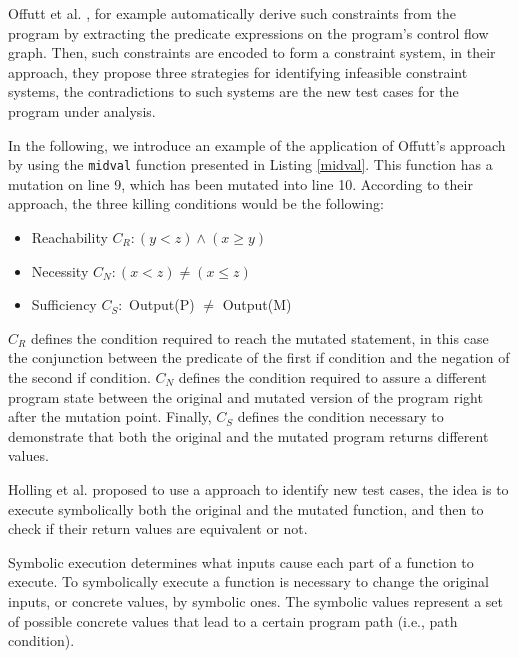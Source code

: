 Offutt et al. \cite{offutt1997automatically}, for example automatically derive such constraints from the program by extracting the predicate expressions on the program's control flow graph.
Then, such constraints are encoded to form a constraint system, in their approach, they propose three strategies for identifying infeasible constraint systems, the contradictions to such systems are the new test cases for the program under analysis.



In the following, we introduce an example of the application of Offutt's \cite{offutt1997automatically} approach by using the \texttt{midval} function presented in Listing \ref{midval}. This function has a mutation on line 9, which has been mutated into line 10. According to their approach, the three killing conditions would be the following:

\begin{itemize}
	\item Reachability $C_R: (y < z) \wedge (x \geq y)$
	\item Necessity $C_N: (x < z) \neq (x \leq z)$
	\item Sufficiency $C_S:$ Output(P) $\neq$ Output(M)
\end{itemize}

$C_R$ defines the condition required to reach the mutated statement, in this case the conjunction between the predicate of the first if condition and the negation of the second if condition. $C_N$ defines the condition required to assure a different program state between the original and mutated version of the program right after the mutation point. Finally, $C_S$ defines the condition necessary to demonstrate that both the original and the mutated program returns different values.

Holling et al. \cite{holling2016nequivack} proposed to use a  approach to identify new test cases, the idea is to execute symbolically both the original and the mutated function, and then to check if their return values are equivalent or not. 


Symbolic execution determines what inputs cause each part of a function to execute. To symbolically execute a function is necessary to change the original inputs, or concrete values, by symbolic ones. The symbolic values represent a set of possible concrete values that lead to a certain program path (i.e., path condition). 

